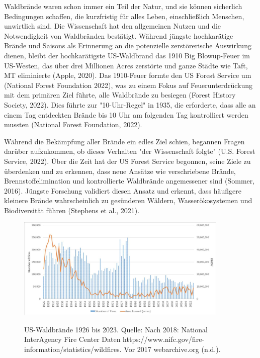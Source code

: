 \documentclass[12pt,paper=a4,DIV=12,parskip=never,chapterprefix=false,headings=standardclasses]{scrreprt}
\begin{document}
Waldbrände waren schon immer ein Teil der Natur, und sie können sicherlich Bedingungen schaffen, die kurzfristig für alles Leben, einschließlich Menschen, unwirtlich sind. Die Wissenschaft hat den allgemeinen Nutzen und die Notwendigkeit von Waldbränden bestätigt. Während jüngste hochkarätige Brände und Saisons als Erinnerung an die potenzielle zerstörerische Auswirkung dienen, bleibt der hochkarätigste US-Waldbrand das 1910 Big Blowup-Feuer im US-Westen, das über drei Millionen Acres zerstörte und ganze Städte wie Taft, MT eliminierte (Apple, 2020). Das 1910-Feuer formte den US Forest Service um (National Forest Foundation 2022), was zu einem Fokus auf Feuerunterdrückung mit dem primären Ziel führte, alle Waldbrände zu besiegen (Forest History Society, 2022). Dies führte zur "10-Uhr-Regel" in 1935, die erforderte, dass alle an einem Tag entdeckten Brände bis 10 Uhr am folgenden Tag kontrolliert werden mussten (National Forest Foundation, 2022).

Während die Bekämpfung aller Brände ein edles Ziel schien, begannen Fragen darüber aufzukommen, ob dieses Verhalten "der Wissenschaft folgte" (U.S. Forest Service, 2022). Über die Zeit hat der US Forest Service begonnen, seine Ziele zu überdenken und zu erkennen, dass neue Ansätze wie verschriebene Brände, Brennstoffelimination und kontrollierte Waldbrände angemessener sind (Sommer, 2016). Jüngste Forschung validiert diesen Ansatz und erkennt, dass häufigere kleinere Brände wahrscheinlich zu gesünderen Wäldern, Wasserökosystemen und Biodiversität führen (Stephens et al., 2021).

\begin{figure}[H]
\begin{center}
\includegraphics[width=0.9\textwidth]{bilder/bilderKlima-0065.jpg}\\[1cm]
\end{center}
\caption{US-Waldbrände 1926 bis 2023. Quelle: Nach 2018: National InterAgency Fire Center Daten https://www.nifc.gov/fire-information/statistics/wildfires. Vor 2017 webarchive.org (n.d.).}
\end{figure}
\end{document}
